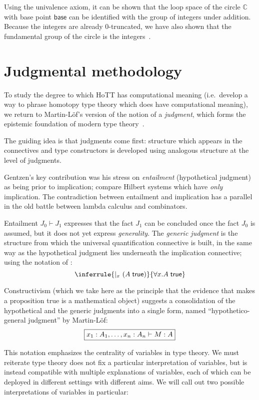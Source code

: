 \documentclass{article}
\newcommand\Circle{\mathbb{C}}
\newcommand\Base{\mathsf{base}}
\DeclarePairedDelimiter\Parens{\lparen}{\rparen}
\begin{document}
Using the univalence axiom, it can be shown that the loop space of the
circle $\Circle$ with base point $\Base$ can be identified with the
group of integers under addition. Because the integers are already
0-truncated, we have also shown that the fundamental group of the
circle is the integers~\citep{Licata:13}.


\section{Judgmental methodology}

To study the degree to which HoTT has computational meaning (i.e.\
develop a way to phrase homotopy type theory which does have
computational meaning), we return to Martin-L\"of's version of the
notion of a \emph{judgment}, which forms the epistemic foundation of
modern type theory~\citep{MartinLof:87,MartinLof:94,MartinLof:96}.

The guiding idea is that judgments come first: structure which appears
in the connectives and type constructors is developed using analogous
structure at the level of judgments.

Gentzen's key contribution was his stress on \emph{entailment}
(hypothetical judgment) as being prior to implication; compare Hilbert
systems which have \emph{only} implication. The contradiction between
entailment and implication has a parallel in the old battle between
lambda calculus and combinators.

Entailment $J_0\vdash J_1$ expresses that the fact $J_1$ can be
concluded once the fact $J_0$ is assumed, but it does not yet express
\emph{generality}. The \emph{generic judgment} is the structure from
which the universal quantification connective is built, in the same
way as the hypothetical judgment lies underneath the implication
connective; using the notation of \citet{MartinLof:notes:87}:
\[
  \inferrule{
    \vert_x\ \Parens*{\trueF{A}}
  }{
    \trueF{\forall x.A}
  }
\]

Constructivism (which we take here as the principle that the evidence
that makes a proposition true is a mathematical object) suggests a
consolidation of the hypothetical and the generic judgments into a
single form, named ``hypothetico-general judgment'' by Martin-L\"of:
\[
  \framebox{$\hasEF{x_1:A_1,\ldots,x_n:A_n}{M}{A}$}
\]

This notation emphasizes the centrality of variables in type
theory. We must reiterate type theory does not fix a particular
interpretation of variables, but is instead compatible with multiple
explanations of variables, each of which can be deployed in different
settings with different aims. We will call out two possible
interpretations of variables in particular:
\end{document}
